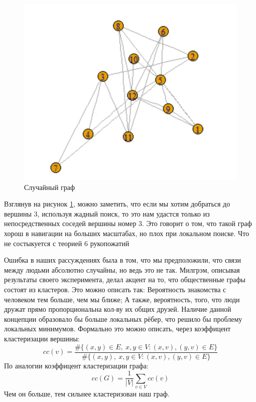 \begin{figure}[H]
\centering
\includegraphics[scale=0.3]{./pictures/random_graph.png}
\caption{Случайный граф} \label{random_graph}
\end{figure}

Взглянув на рисунок \ref{random_graph}, можно заметить, что если мы хотим добраться до вершины 3,
используя жадный поиск, то это нам удастся только из непосредственных соседей вершины номер 3.
Это говорит о том, что такой граф хорош в навигации на больших масштабах, но плох при локальном
поиске. Что не состыкуется с теорией 6 рукопожатий

Ошибка в наших рассуждениях была в том, что мы предположили, что связи между людьми абсолютно
случайны, но ведь это не так. Милгрэм, описывая результаты своего эксперимента, делал акцент
на то, что общественные графы состоят из кластеров. Это можно описать так: Вероятность знакомства
с человеком тем больше, чем мы ближе; А также, вероятность, того, что люди дружат прямо пропорциональна
кол-ву их общих друзей. Наличие данной концепции образовало бы больше локальных рёбер, что решило бы
проблему локальных минимумов. Формально это можно описать, через коэффицент кластеризации вершины:
\begin{equation*}
    cc(v) = \frac{\#\{(x, y) \in E, \ x, y \in V: (x, v), (y, v) \in E\}}
    {\#\{(x, y), \ x, y \in V: (x, v), (y, v) \in E\}}
\end{equation*}
По аналогии коэффицент кластеризации графа:
\begin{equation*}
    cc(G) = \frac{1}{|V|}\sum_{v \in V}cc(v)
\end{equation*}
Чем он больше, тем сильнее кластеризован наш граф. 

